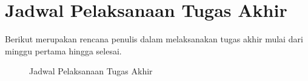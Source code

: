 \section{Jadwal Pelaksanaan Tugas Akhir}

Berikut merupakan rencana penulis dalam melaksanakan tugas akhir mulai dari minggu pertama hingga selesai.


\begin{figure}[ht]
  \centering
  \qquad
  \caption{Jadwal Pelaksanaan Tugas Akhir}
\end{figure}